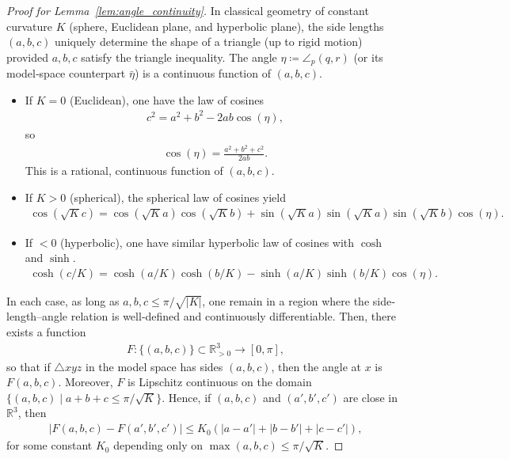 \begin{proof}[Proof for Lemma~\ref{lem:angle_continuity}]
    In classical geometry of constant curvature $K$ (sphere, Euclidean plane, and hyperbolic plane), the side lengths $(a, b, c)$ uniquely determine the shape of a triangle (up to rigid motion) provided $a, b, c$ satisfy the triangle inequality.
    The angle $\eta \coloneqq \angle_p(q,r)$ (or its model‐space counterpart $\bar{\eta}$) is a continuous function of $(a, b, c)$.
    \begin{itemize}
        \item If $K = 0$ (Euclidean), one have the law of cosines
        \begin{align*}
            c^2 = a^2 + b^2 - 2ab \cos(\eta),
        \end{align*}
        so
        \begin{align*}
            \cos(\eta) = \frac{a^2 + b^2 + c^2}{2ab}.
        \end{align*}
        This is a rational, continuous function of $(a, b, c)$.
        \item If $K > 0$ (spherical), the spherical law of cosines yield
        \begin{align*}
            \cos(\sqrt{K}c) = \cos(\sqrt{K}a)\cos(\sqrt{K}b) + \sin(\sqrt{K}a)\sin(\sqrt{K}a)\sin(\sqrt{K}b)\cos(\eta).
        \end{align*}
        \item If $ < 0$ (hyperbolic), one have similar hyperbolic law of cosines with $\cosh$ and $\sinh$.
        \begin{align*}
            \cosh(c / K) = \cosh(a / K)\cosh(b / K) - \sinh(a / K)\sinh(b / K)\cos(\eta).
        \end{align*}
    \end{itemize}
    In each case, as long as $a, b, c \leq \pi / \sqrt{|K|}$, one remain in a region where the side‐length–angle relation is well‐defined and continuously differentiable.
    Then, there exists a function
    \begin{align*}
        F \colon \{(a, b, c)\} \subset 
        \mathbb{R}^3_{>0} \to [0, \pi],
    \end{align*}
    so that if $\triangle xyz$ in the model space has sides $(a, b, c)$, then the angle at $x$ is $F(a, b, c)$.
    Moreover, $F$ is Lipschitz continuous on the domain $\{(a, b, c) \mid a + b + c \leq \pi / \sqrt{K} \}$.
    Hence, if $(a, b, c)$ and $(a', b', c')$ are close in $\mathbb{R}^3$, then
    \begin{align*}
        \left|F(a, b, c) - F(a', b', c')\right| \leq K_0\left(|a - a'| + |b - b'| + |c - c'|\right),
    \end{align*}
    for some constant $K_0$ depending only on $\max(a, b, c) \leq \pi / \sqrt{K}$.


\end{proof}
